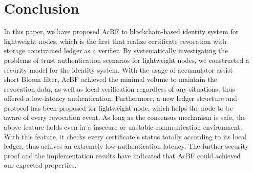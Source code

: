\documentclass[conference]{IEEEtran}
\begin{document}
\section{Conclusion}\label{sec:conclusion}
In this paper, we have proposed AcBF to blockchain-based identity system for lightweight nodes, which is the first that realize certificate revocation with storage constrained ledger as a verifier. By systematically investigating the problems of trust authentication scenarios for lightweight nodes, we constructed a security model for the identity system. With the usage of accumulator-assist short Bloom filter, AcBF achieved the minimal volume to maintain the revocation data, as well as local verification regardless of any situations, thus offered a low-latency authentication. Furthermore, a new ledger structure and protocol has been proposed for lightweight node, which helps the node to be aware of every revocation event. 
As long as the consensus mechanism is safe, the above feature holds even in a insecure or unstable communication environment. 
With this feature, it checks every certificate's status totally according to its local ledger, thus achives an extremely low authentication latency. The further security proof and the implementation results have indicated that AcBF could achieved our expected properties.%

\balance


\end{document}
